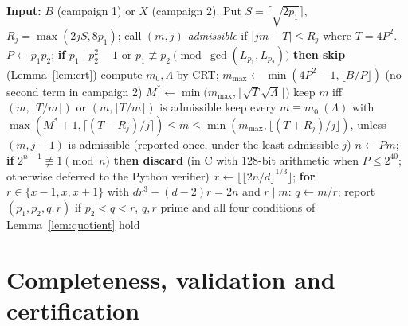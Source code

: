\documentclass[11pt]{amsart}
\theoremstyle{definition}
\theoremstyle{remark}
\begin{document}
\begin{algorithm}[h]
\caption{Enumeration of four-prime Williams numbers (campaign 1: all $n\le B$; campaign 2: all $n$ with $p_1\le X$)}\label{alg}
\begin{algorithmic}[1]
\State \textbf{Input:} $B$ (campaign 1) or $X$ (campaign 2). Put $S=\lceil\sqrt{2p_1}\rceil$, $R_j=\max(2jS,8p_1)$; call $(m,j)$ \emph{admissible} if $|jm-T|\le R_j$ where $T=4P^2$.
 
\State $P\gets p_1p_2$; \textbf{if} $p_1\mid p_2^2-1$ or $p_1\not\equiv p_2\pmod{\gcd(L_{p_1},L_{p_2})}$ \textbf{then skip} (Lemma~\ref{lem:crt})
\State compute $m_0,\Lambda$ by CRT; $m_{\max}\gets\min(4P^2-1,\lfloor B/P\rfloor)$ (no second term in campaign 2)
\State $M^*\gets\min\bigl(m_{\max},\lfloor\sqrt{T}\sqrt{\Lambda}\rfloor\bigr)$ 
 
\State keep $m$ iff $(m,\lfloor T/m\rfloor)$ or $(m,\lceil T/m\rceil)$ is admissible
\EndFor
{} 
\State keep every $m\equiv m_0\ (\Lambda)$ with $\max(M^*+1,\lceil(T-R_j)/j\rceil)\le m\le\min(m_{\max},\lfloor(T+R_j)/j\rfloor)$, unless $(m,j-1)$ is admissible (reported once, under the least admissible $j$)
\EndFor
{} 
\State $n\gets Pm$; \textbf{if} $2^{n-1}\not\equiv1\pmod n$ \textbf{then discard} (in C with $128$-bit arithmetic when $P\le2^{40}$; otherwise deferred to the Python verifier)
 \State $x\gets\lfloor\lfloor2n/d\rfloor^{1/3}\rfloor$; \textbf{for} $r\in\{x-1,x,x+1\}$ with $dr^3-(d-2)r=2n$ and $r\mid m$: $q\gets m/r$; report $(p_1,p_2,q,r)$ if $p_2<q<r$, $q,r$ prime and all four conditions of Lemma~\ref{lem:quotient} hold
\EndFor
\EndFor
\EndFor
\EndFor
\end{algorithmic}
\end{algorithm}

\section{Completeness, validation and certification}\label{sec:complete}
\end{document}
